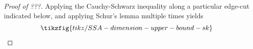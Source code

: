 \documentclass[notitlepage, 10pt]{article}
\begin{document}
\begin{proof}[Proof of ???]
    Applying the Cauchy-Schwarz inequality along a particular edge-cut indicated below, and applying Schur's lemma multiple times yields
    \begin{equation}
        \tikzfig{tikz/SSA-dimension-upper-bound-sk}
    \end{equation}
\end{proof}

\end{document}
